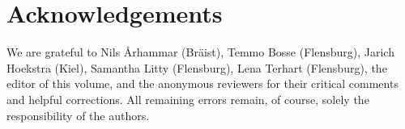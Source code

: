 \documentclass[output=paper]{langsci/langscibook}
\begin{document}
\section*{Acknowledgements}

We are grateful to Nils Århammar (Bräist), Temmo Bosse (Flensburg), Jarich Hoekstra (Kiel), Samantha Litty (Flensburg), Lena Terhart (Flensburg), the editor of this volume, and the anonymous reviewers for their critical comments and helpful corrections. All remaining errors remain, of course, solely the responsibility of the authors.

\largerpage
{\sloppy\printbibliography[heading=subbibliography,notkeyword=this]}
\end{document}
